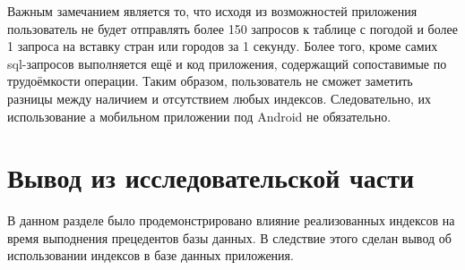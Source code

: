 Важным замечанием является то, что исходя из возможностей приложения пользователь не будет отправлять более 150 запросов к таблице с погодой и более 1 запроса на вставку стран или городов за 1 секунду.
Более того, кроме самих sql-запросов выполняется ещё и код приложения, содержащий сопоставимые по трудоёмкости операции.
Таким образом, пользователь не сможет заметить разницы между наличием и отсутствием любых индексов.
Следовательно, их использование а мобильном приложении под Android не обязательно.

\section*{Вывод из исследовательской части}
В данном разделе было продемонстрировано влияние реализованных индексов на время выподнения прецедентов базы данных.
В следствие этого сделан вывод об использовании индексов в базе данных приложения.
